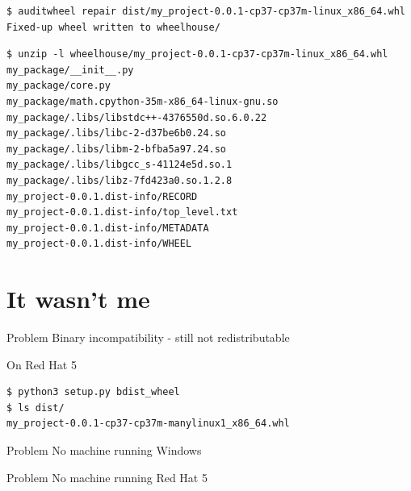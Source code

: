 \documentclass[pdf]{beamer}
\begin{document}
\begin{frame}[fragile]
    \begin{verbatim}
$ auditwheel repair dist/my_project-0.0.1-cp37-cp37m-linux_x86_64.whl
Fixed-up wheel written to wheelhouse/
    \end{verbatim}
\end{frame}

\begin{frame}[fragile]
    \begin{verbatim}
$ unzip -l wheelhouse/my_project-0.0.1-cp37-cp37m-linux_x86_64.whl
my_package/__init__.py
my_package/core.py
my_package/math.cpython-35m-x86_64-linux-gnu.so
my_package/.libs/libstdc++-4376550d.so.6.0.22
my_package/.libs/libc-2-d37be6b0.24.so
my_package/.libs/libm-2-bfba5a97.24.so
my_package/.libs/libgcc_s-41124e5d.so.1
my_package/.libs/libz-7fd423a0.so.1.2.8
my_project-0.0.1.dist-info/RECORD
my_project-0.0.1.dist-info/top_level.txt
my_project-0.0.1.dist-info/METADATA
my_project-0.0.1.dist-info/WHEEL
    \end{verbatim}
\end{frame}

\section{It wasn't me}

\begin{frame}
    \begin{block}{Problem}
        Binary incompatibility - still not redistributable
    \end{block}
\end{frame}

\begin{frame}[fragile]
    \begin{block}{On Red Hat 5}
        \begin{verbatim}
$ python3 setup.py bdist_wheel
$ ls dist/
my_project-0.0.1-cp37-cp37m-manylinux1_x86_64.whl
        \end{verbatim}
    \end{block}
\end{frame}

\begin{frame}
    \begin{block}{Problem}
        No machine running Windows
    \end{block}
\end{frame}

\begin{frame}
    \begin{block}{Problem}
        No machine running Red Hat 5
    \end{block}
\end{frame}
\end{document}
